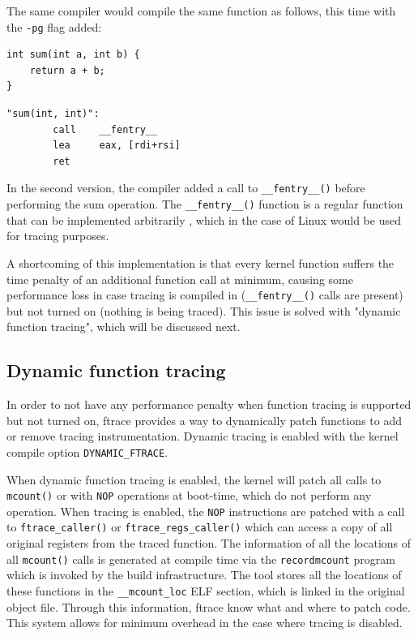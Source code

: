 \noindent
\vspace{1.0em}

The same compiler would compile the same function as follows, this time with the
\verb|-pg| flag added:

\vspace{1.0em}

\begin{minipage}[t]{0.47\textwidth}
\begin{verbatim}
int sum(int a, int b) {
    return a + b;
}
\end{verbatim}
\end{minipage}%
\hfill
\vrule %
\hfill
\begin{minipage}[t]{0.47\textwidth}
\begin{verbatim}
"sum(int, int)":
        call    __fentry__
        lea     eax, [rdi+rsi]
        ret
\end{verbatim}
\end{minipage}

\vspace{1.0em}

In the second version, the compiler added a call to \verb|__fentry__()| before
performing the sum operation. The \verb|__fentry__()| function is a regular
function that can be implemented arbitrarily , which in the case of Linux would
be used for tracing purposes.

A shortcoming of this implementation is that every kernel function suffers the
time penalty of an additional function call at minimum, causing some performance
loss in case tracing is compiled in (\verb|__fentry__()| calls are present) but
not turned on (nothing is being traced). This issue is solved with "dynamic
function tracing", which will be discussed next.

\subsection{Dynamic function tracing}

In order to not have any performance penalty when function tracing is supported
but not turned on, ftrace provides a way to dynamically patch functions to add
or remove tracing instrumentation. Dynamic tracing is enabled with the kernel
compile option \verb|DYNAMIC_FTRACE|.

When dynamic function tracing is enabled, the kernel will patch all calls to
\verb|mcount()| or  with \verb|NOP| operations at boot-time,
which do not perform any operation. When tracing is enabled, the \verb|NOP|
instructions are patched with a call to \verb|ftrace_caller()| or
\verb|ftrace_regs_caller()| which can access a copy of all original registers
from the traced function. The information of all the locations of all
\verb|mcount()| calls is generated at compile time via the \verb|recordmcount|
program which is invoked by the build infrastructure. The tool stores all the
locations of these functions in the \verb|__mcount_loc| ELF section, which is
linked in the original object file. Through this information, ftrace know what
and where to patch code. This system allows for minimum overhead in the case
where tracing is disabled.

